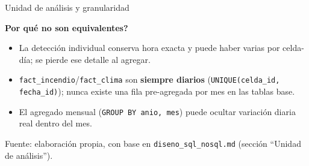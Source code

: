 \documentclass[aspectratio=169,11pt]{beamer}
\newcommand{\fuente}[1]{{\vfill\tiny\color{GrisTexto!70!black} Fuente: #1}}
\begin{document}
\begin{frame}{Unidad de an\'alisis y granularidad}
  \begin{center}
  \end{center}
  \vspace{0.35cm}
  \textbf{\small \textquestiondown Por qu\'e no son equivalentes?}
  \begin{itemize}\small
    \item La detecci\'on individual conserva hora exacta y puede haber varias por celda-d\'ia; se pierde ese detalle al agregar.
    \item \texttt{fact\_incendio}/\texttt{fact\_clima} son \textbf{siempre diarios} (\texttt{UNIQUE(celda\_id, fecha\_id)}); nunca existe una fila pre-agregada por mes en las tablas base.
    \item El agregado mensual (\texttt{GROUP BY anio, mes}) puede ocultar variaci\'on diaria real dentro del mes.
  \end{itemize}
  \fuente{elaboraci\'on propia, con base en \texttt{diseno\_sql\_nosql.md} (secci\'on ``Unidad de an\'alisis'').}
\end{frame}
\end{document}
